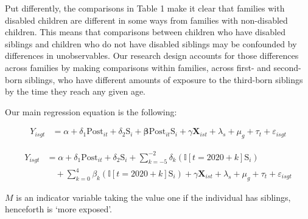 Put differently, the comparisons in Table 1 make it clear that families with disabled children are different in some ways from families with non-disabled children. This means that comparisons between children who have disabled siblings and children who do not have disabled siblings may be confounded by differences in unobservables. Our research design accounts for those differences across families by making comparisons within families, across first- and second-born siblings, who have different amounts of exposure to the third-born siblings by the time they reach any given age. 

Our main regression equation is the following:

    \begin{align}
    Y_{isgt} &= \alpha + \delta_1 \text{Post}_{it} + \delta_2 \text{S}_{i}   + \boldsymbol{\beta} \text{Post}_{it} \text{S}_{i}  + \gamma\mathbf{X}_{ist} + \lambda_s + \mu_g + \tau_t + \varepsilon_{isgt}
    \end{align}

     \begin{align}
    Y_{isgt} &= \alpha + \delta_1 \text{Post}_{it} + \delta_2 \text{S}_{i}   + \sum_{k=-5}^{-2} \delta_k (\mathbb{I}[t = 2020+k] \text{S}_{i}) \nonumber \\
    & \quad + \sum_{k=0}^{4} \beta_k (\mathbb{I}[t = 2020 + k]  \text{S}_{i})  + \gamma\mathbf{X}_{ist} + \lambda_s + \mu_g + \tau_t + \varepsilon_{isgt}
    \end{align}   


$M$ is an indicator variable taking the value one if the individual has siblings, henceforth is ‘more exposed’.
    
